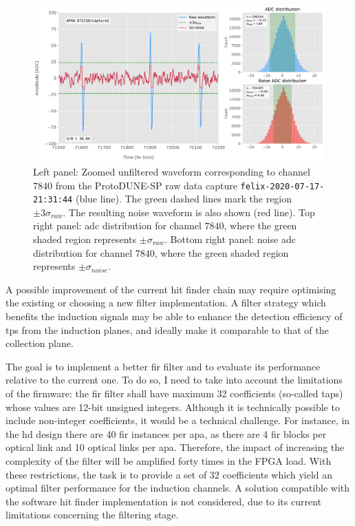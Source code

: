 \begin{figure}[t]
	\centering
	\includegraphics[width=1\linewidth]{Images/Matched_Filter/waveform_example_raw}
	\caption[Example unfiltered waveform from a ProtoDUNE-SP raw data capture.]{Left panel: Zoomed unfiltered waveform corresponding to channel $7840$ from the ProtoDUNE-SP raw data capture \texttt{felix-2020-07-17-21:31:44} (blue line). The green dashed lines mark the region $\pm3\sigma_{raw}$. The resulting noise waveform is also shown (red line). Top right panel: \gls{adc} distribution for channel $7840$, where the green shaded region represents $\pm \sigma_{raw}$. Bottom right panel: noise \gls{adc} distribution for channel $7840$, where the green shaded region represents $\pm \sigma_{noise}$.}
	\label{fig:adcs_nofir}
\end{figure}

A possible improvement of the current hit finder chain may require optimising the existing or choosing a new filter implementation. A filter strategy which benefits the induction signals may be able to enhance the detection efficiency of \gls{tp}s from the induction planes, and ideally make it comparable to that of the collection plane.  

The goal is to implement a better \gls{fir} filter and to evaluate its performance relative to the current one. To do so, I need to take into account the limitations of the firmware: the \gls{fir} filter shall have maximum 32 coefficients (so-called taps) whose values are 12-bit unsigned integers. Although it is technically possible to include non-integer coefficients, it would be a technical challenge. For instance, in the \gls{hd} design there are 40 \gls{fir} instances per \gls{apa}, as there are 4 \gls{fir} blocks per optical link and 10 optical links per \gls{apa}. Therefore, the impact of increasing the complexity of the filter will be amplified forty times in the FPGA load. With these restrictions, the task is to provide a set of 32 coefficients which yield an optimal filter performance for the induction channels. A solution compatible with the software hit finder implementation is not considered, due to its current limitations concerning the filtering stage.

